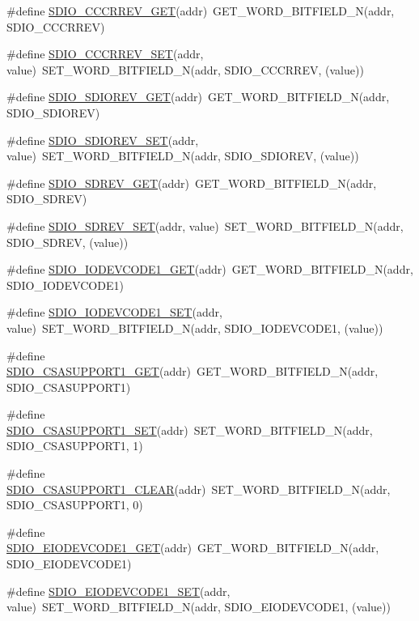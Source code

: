\begin{DoxyCompactItemize}
\item 
\#define \hyperlink{a00570_a2385a70217ad6b91d786a21a3699fc12}{SDIO\_\-CCCRREV\_\-GET}(addr)~GET\_\-WORD\_\-BITFIELD\_\-N(addr, SDIO\_\-CCCRREV)
\item 
\#define \hyperlink{a00570_a29beb805127c3a871248a640791c915b}{SDIO\_\-CCCRREV\_\-SET}(addr, value)~SET\_\-WORD\_\-BITFIELD\_\-N(addr, SDIO\_\-CCCRREV, (value))
\item 
\#define \hyperlink{a00570_a54ef33e642ab876614eaa1d9e3d17897}{SDIO\_\-SDIOREV\_\-GET}(addr)~GET\_\-WORD\_\-BITFIELD\_\-N(addr, SDIO\_\-SDIOREV)
\item 
\#define \hyperlink{a00570_a06ac380b28af52b65b70b98e754094c9}{SDIO\_\-SDIOREV\_\-SET}(addr, value)~SET\_\-WORD\_\-BITFIELD\_\-N(addr, SDIO\_\-SDIOREV, (value))
\item 
\#define \hyperlink{a00570_a1221d80f186e302f719daaa6f808c258}{SDIO\_\-SDREV\_\-GET}(addr)~GET\_\-WORD\_\-BITFIELD\_\-N(addr, SDIO\_\-SDREV)
\item 
\#define \hyperlink{a00570_a811e1a0d115653f53d2f31a6c9ad083c}{SDIO\_\-SDREV\_\-SET}(addr, value)~SET\_\-WORD\_\-BITFIELD\_\-N(addr, SDIO\_\-SDREV, (value))
\item 
\#define \hyperlink{a00570_ab92e631b96272e90b0527b6dd174d078}{SDIO\_\-IODEVCODE1\_\-GET}(addr)~GET\_\-WORD\_\-BITFIELD\_\-N(addr, SDIO\_\-IODEVCODE1)
\item 
\#define \hyperlink{a00570_a83b8c32790582b1e767357e891c363c7}{SDIO\_\-IODEVCODE1\_\-SET}(addr, value)~SET\_\-WORD\_\-BITFIELD\_\-N(addr, SDIO\_\-IODEVCODE1, (value))
\item 
\#define \hyperlink{a00570_ac7d935891e6ee9ca784f67b61c9b52f5}{SDIO\_\-CSASUPPORT1\_\-GET}(addr)~GET\_\-WORD\_\-BITFIELD\_\-N(addr, SDIO\_\-CSASUPPORT1)
\item 
\#define \hyperlink{a00570_a9283dcf45c0de07066996bd8349a2117}{SDIO\_\-CSASUPPORT1\_\-SET}(addr)~SET\_\-WORD\_\-BITFIELD\_\-N(addr, SDIO\_\-CSASUPPORT1, 1)
\item 
\#define \hyperlink{a00570_af833fe2ddea8a2c756085250f2b5f2f0}{SDIO\_\-CSASUPPORT1\_\-CLEAR}(addr)~SET\_\-WORD\_\-BITFIELD\_\-N(addr, SDIO\_\-CSASUPPORT1, 0)
\item 
\#define \hyperlink{a00570_ac2bdbf975f1bae176b2340c8f71d27df}{SDIO\_\-EIODEVCODE1\_\-GET}(addr)~GET\_\-WORD\_\-BITFIELD\_\-N(addr, SDIO\_\-EIODEVCODE1)
\item 
\#define \hyperlink{a00570_aec514c513c5307a50b1831371218b831}{SDIO\_\-EIODEVCODE1\_\-SET}(addr, value)~SET\_\-WORD\_\-BITFIELD\_\-N(addr, SDIO\_\-EIODEVCODE1, (value))

\end{DoxyCompactItemize}
